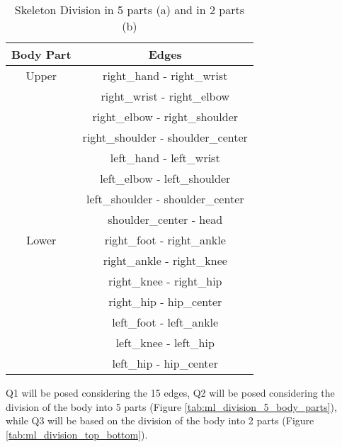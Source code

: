 \begin{table}[H]
    \begin{subtable}{\textwidth}
        \centering
        \begin{tabular}{||c||c||}
            \hline
            \textbf{Body Part} & \textbf{Edges} \\
            \hline
            Upper & right\_hand - right\_wrist \\
            & right\_wrist - right\_elbow \\
            & right\_elbow - right\_shoulder \\
            & right\_shoulder - shoulder\_center \\
            & left\_hand - left\_wrist \\
            & left\_elbow - left\_shoulder \\
            & left\_shoulder - shoulder\_center \\
            & shoulder\_center - head \\
            \hline
            Lower & right\_foot - right\_ankle \\
            & right\_ankle - right\_knee \\
            & right\_knee - right\_hip \\
            & right\_hip - hip\_center \\
            & left\_foot - left\_ankle \\
            & left\_knee - left\_hip \\
            & left\_hip - hip\_center \\
            \hline
        \end{tabular}
        \caption{}
        \label{tab:ml_division_top_bottom}
    \end{subtable}

    \caption{Skeleton Division in 5 parts (a) and in 2 parts (b)}
    \label{tab:ml_skeleton_divisions}
\end{table}

Q1 will be posed considering the 15 edges, Q2 will be posed considering the division of the body into 5 parts (Figure \ref{tab:ml_division_5_body_parts}), while Q3 will be based on the division of the body into 2 parts (Figure \ref{tab:ml_division_top_bottom}).

